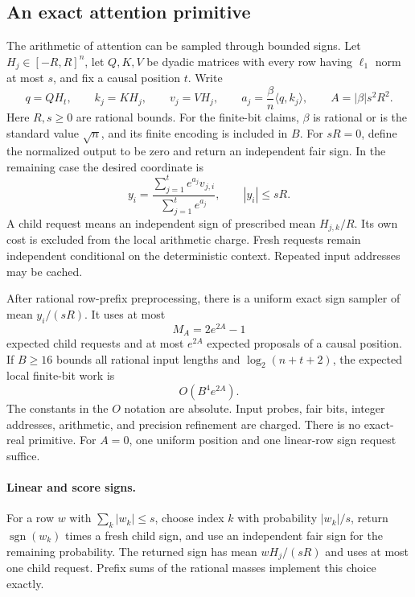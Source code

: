 
\subsection{An exact attention primitive}\label{sec:attentionprimitive}

The arithmetic of attention can be sampled through bounded signs.  Let
$H_j\in[-R,R]^n$, let $Q,K,V$ be dyadic matrices with every row having
$\ell_1$ norm at most $s$, and fix a causal position $t$.  Write
\[
 q=QH_t,\qquad k_j=KH_j,\qquad v_j=VH_j,\qquad
 a_j=\frac{\beta}{n}\langle q,k_j\rangle,\qquad
 A=|\beta|s^2R^2.
\]
Here $R,s\ge0$ are rational bounds. For the finite-bit claims,
$\beta$ is rational or is the standard value $\sqrt n$, and its
finite encoding is included in $B$. For $sR=0$, define the normalized output to be zero and return an
independent fair sign.  In the remaining case the desired coordinate is
\begin{equation}\label{eq:attentiontarget}
 y_i=\frac{\sum_{j=1}^t e^{a_j}v_{j,i}}{
                    \sum_{j=1}^t e^{a_j}},\qquad |y_i|\le sR.
\end{equation}
A child request means an independent sign of prescribed mean
$H_{j,k}/R$.  Its own cost is excluded from the local arithmetic charge.
Fresh requests remain independent conditional on the deterministic context.
Repeated input addresses may be cached.

\begin{theorem}\label{thm:attentionprimitive}
After rational row-prefix preprocessing, there is a uniform exact sign
sampler of mean $y_i/(sR)$.  It uses at most
\begin{equation}\label{eq:attentionoffspring}
 M_A=2e^{2A}-1
\end{equation}
expected child requests and at most $e^{2A}$ expected proposals of a causal
position.  If $B\ge16$ bounds all rational input lengths and
$\log_2(n+t+2)$, the expected local finite-bit work is
\begin{equation}\label{eq:attentionlocalbits}
 O(B^4e^{2A}).
\end{equation}
The constants in the $O$ notation are absolute.  Input probes, fair bits,
integer addresses, arithmetic, and precision refinement are charged.
There is no exact-real primitive.  For $A=0$, one uniform position and one
linear-row sign request suffice.
\end{theorem}

\paragraph{Linear and score signs.}
For a row $w$ with $\sum_k|w_k|\le s$, choose index $k$ with probability
$|w_k|/s$, return $\operatorname{sgn}(w_k)$ times a fresh child sign, and
use an independent fair sign for the remaining probability.  The returned
sign has mean $wH_j/(sR)$ and uses at most one child request.  Prefix sums
of the rational masses implement this choice exactly.

